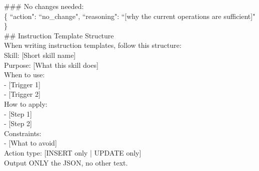 \begin{center}
\begin{tcolorbox}[title={Designer Refinement Prompt (2/2)}]
{
\#\#\# No changes needed: \\
\{
    ``action": ``no\_change",
    ``reasoning": ``[why the current operations are sufficient]"
\} \\

\#\# Instruction Template Structure \\
When writing instruction templates, follow this structure: \\


Skill: [Short skill name] \\
Purpose: [What this skill does] \\
When to use: \\
- [Trigger 1] \\
- [Trigger 2] \\
How to apply: \\
- [Step 1] \\
- [Step 2] \\
Constraints: \\
- [What to avoid] \\
Action type: [INSERT only | UPDATE only] \\

Output ONLY the JSON, no other text.
}
\label{appendix:case_designer_2_2}
\end{tcolorbox}
\end{center}




